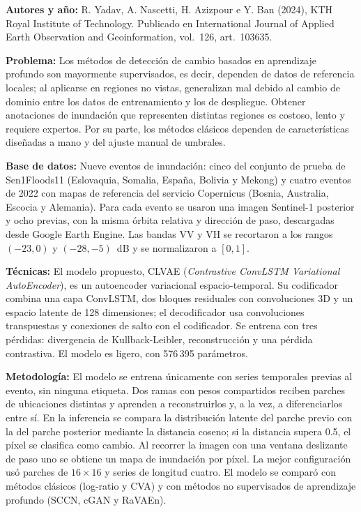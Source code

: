 \documentclass[conference]{IEEEtran}
\begin{document}
\textbf{Autores y año:} R. Yadav, A. Nascetti, H. Azizpour e Y. Ban (2024), KTH Royal Institute of Technology. Publicado en International Journal of Applied Earth Observation and Geoinformation, vol.~126, art.~103635.

\textbf{Problema:} Los métodos de detección de cambio basados en aprendizaje profundo son mayormente supervisados, es decir, dependen de datos de referencia locales; al aplicarse en regiones no vistas, generalizan mal debido al cambio de dominio entre los datos de entrenamiento y los de despliegue. Obtener anotaciones de inundación que representen distintas regiones es costoso, lento y requiere expertos. Por su parte, los métodos clásicos dependen de características diseñadas a mano y del ajuste manual de umbrales.

\textbf{Base de datos:} Nueve eventos de inundación: cinco del conjunto de prueba de Sen1Floods11 (Eslovaquia, Somalia, España, Bolivia y Mekong) y cuatro eventos de 2022 con mapas de referencia del servicio Copernicus (Bosnia, Australia, Escocia y Alemania). Para cada evento se usaron una imagen Sentinel-1 posterior y ocho previas, con la misma órbita relativa y dirección de paso, descargadas desde Google Earth Engine. Las bandas VV y VH se recortaron a los rangos $(-23, 0)$ y $(-28, -5)$~dB y se normalizaron a $[0,1]$.

\textbf{Técnicas:} El modelo propuesto, CLVAE (\textit{Contrastive ConvLSTM Variational AutoEncoder}), es un autoencoder variacional espacio-temporal. Su codificador combina una capa ConvLSTM, dos bloques residuales con convoluciones 3D y un espacio latente de 128 dimensiones; el decodificador usa convoluciones transpuestas y conexiones de salto con el codificador. Se entrena con tres pérdidas: divergencia de Kullback-Leibler, reconstrucción y una pérdida contrastiva. El modelo es ligero, con 576\,395 parámetros.

\textbf{Metodología:} El modelo se entrena únicamente con series temporales previas al evento, sin ninguna etiqueta. Dos ramas con pesos compartidos reciben parches de ubicaciones distintas y aprenden a reconstruirlos y, a la vez, a diferenciarlos entre sí. En la inferencia se compara la distribución latente del parche previo con la del parche posterior mediante la distancia coseno; si la distancia supera 0.5, el píxel se clasifica como cambio. Al recorrer la imagen con una ventana deslizante de paso uno se obtiene un mapa de inundación por píxel. La mejor configuración usó parches de $16\times16$ y series de longitud cuatro. El modelo se comparó con métodos clásicos (log-ratio y CVA) y con métodos no supervisados de aprendizaje profundo (SCCN, cGAN y RaVAEn).
\end{document}

